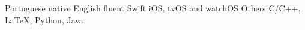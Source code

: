 \begin{cvskills}
  \cvskill
    {Portuguese}
    {native}
  \cvskill
    {English}
    {fluent}
  \cvskill
    {Swift}
    {iOS, tvOS and watchOS}
  \cvskill
    {Others}
    {C/C++, \LaTeX, Python, Java}
\end{cvskills}
